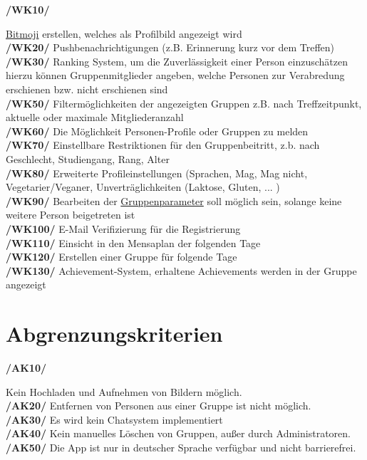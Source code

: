 \documentclass[a4paper]{scrreprt}
\begin{document}
\begin{addmargin}[25pt]{0pt} 
\hypertarget{wk10}{\textbf{/WK10/}} \hyperlink{label7}{Bitmoji} erstellen, welches als Profilbild angezeigt wird \\
\hypertarget{wk20}{\textbf{/WK20/}} Pushbenachrichtigungen (z.B. Erinnerung kurz vor dem Treffen) \\
\hypertarget{wk30}{\textbf{/WK30/}} Ranking System, um die Zuverlässigkeit einer Person einzuschätzen \\ 
	hierzu können Gruppenmitglieder angeben, welche Personen zur Verabredung erschienen bzw. nicht erschienen sind\\

\hypertarget{wk50}{\textbf{/WK50/}} Filtermöglichkeiten der angezeigten Gruppen z.B. nach Treffzeitpunkt, aktuelle oder maximale Mitgliederanzahl \\
\hypertarget{wk60}{\textbf{/WK60/}} Die Möglichkeit Personen-Profile oder Gruppen zu melden\\
\hypertarget{wk70}{\textbf{/WK70/}} Einstellbare Restriktionen für den Gruppenbeitritt, z.b. nach Geschlecht, Studiengang, Rang, Alter \\
\hypertarget{wk80}{\textbf{/WK80/}} Erweiterte Profileinstellungen (Sprachen, Mag, Mag nicht, Vegetarier/Veganer, Unverträglichkeiten (Laktose, Gluten, ... )\\
\hypertarget{wk90}{\textbf{/WK90/}} Bearbeiten der \hyperlink{label2}{Gruppenparameter} soll möglich sein, solange keine weitere Person beigetreten ist\\
\hypertarget{wk100}{\textbf{/WK100/}} E-Mail Verifizierung für die Registrierung\\
\hypertarget{wk110}{\textbf{/WK110/}} Einsicht in den Mensaplan der folgenden Tage\\
\hypertarget{wk120}{\textbf{/WK120/}} Erstellen einer Gruppe für folgende Tage\\
\hypertarget{wk130}{\textbf{/WK130/}} Achievement-System, erhaltene Achievements werden in der Gruppe angezeigt\\
\end{addmargin}
 
\section{Abgrenzungskriterien}

\begin{addmargin}[25pt]{0pt} 
\hypertarget{ak10}{\textbf{/AK10/}} Kein Hochladen und Aufnehmen von Bildern möglich.\\
\hypertarget{ak20}{\textbf{/AK20/}} Entfernen von Personen aus einer Gruppe ist nicht möglich.\\
\hypertarget{ak30}{\textbf{/AK30/}} Es wird kein Chatsystem implementiert\\
\hypertarget{ak40}{\textbf{/AK40/}} Kein manuelles Löschen von Gruppen, außer durch Administratoren.\\
\hypertarget{ak50}{\textbf{/AK50/}} Die App ist nur in deutscher Sprache verfügbar und nicht barrierefrei. \\
\end{addmargin}
\end{document}
